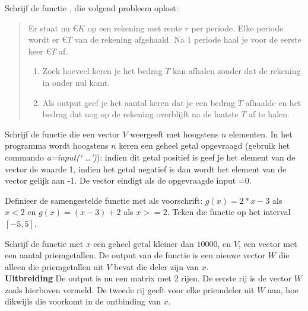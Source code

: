 \begin{oef}
Schrijf de functie , die volgend probleem oplost:
\begin{quote}
Er staat nu \euro $K$  op een rekening met  rente $r$  per periode.
Elke periode wordt er \euro ${T}$ van de  rekening afgehaald. 
Na 1 periode haal je voor de eerste keer \euro ${T}$ af.
\begin{enumerate}
    \item Zoek hoeveel keren je het bedrag $T$ kan afhalen zonder dat de rekening in onder nul komt.
    \item Als output geef je het aantal keren dat je een bedrag 
          $T$ afhaalde en het bedrag dat nog op de rekening overblijft na 
          de laatste $T$ af te halen.
\end{enumerate}  
\end{quote}
\begin{opl}
\end{opl}
\end{oef}

\begin{oef}
Schrijf de functie  die een vector $V$ 
weergeeft met hoogstens $n$ elementen. In het programma wordt hoogstens $n$ keren 
een geheel getal opgevraagd (gebruik het commando \emph{a=input(`  \ldots')}):
indien dit getal positief is geef je  het element van de vector de waarde 1, 
indien het getal negatief is dan wordt het element van de vector gelijk aan -1.
De vector eindigt als de opgevraagde input =0.
\begin{opl}
\end{opl}
\end{oef}


\begin{oef}
Definieer de samengestelde functie  met
als voorschrift:
$g(x)=2*x-3$ als $x<2$ en $g(x)=(x-3)+2$ als $x>=2$. 
Teken die functie op het interval $[-5,5]$.
\begin{opl}
\end{opl}
\end{oef}

\begin{oef}
Schrijf de functie  met $x$ een 
geheel getal kleiner dan  $10000$, en $V$, een vector met een 
aantal priemgetallen. De output van de functie is een nieuwe 
vector $W$ die alleen die priemgetallen uit $V$ bevat die deler 
zijn van $x$.\\
\textbf{Uitbreiding} De output is nu een matrix met 2 rijen. De 
eerste rij is de vector $W$ zoals hierboven vermeld. De tweede 
rij geeft voor elke priemdeler uit $W$ aan, hoe dikwijls die voorkomt in 
de ontbinding van $x$.
\begin{opl}
\end{opl}
\end{oef}


